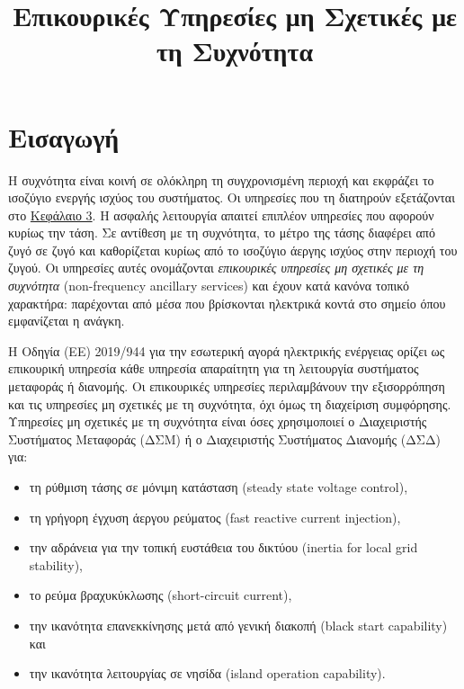 \title{Επικουρικές Υπηρεσίες μη Σχετικές με τη Συχνότητα}

\section{Εισαγωγή}
\label{kef-02-theoria}

Η συχνότητα είναι κοινή σε ολόκληρη τη συγχρονισμένη περιοχή και εκφράζει το ισοζύγιο
ενεργής ισχύος του συστήματος. Οι υπηρεσίες που τη διατηρούν εξετάζονται στο
\hyperref[kef-03-theoria]{Κεφάλαιο 3}. Η ασφαλής λειτουργία απαιτεί επιπλέον υπηρεσίες που
αφορούν κυρίως την τάση. Σε αντίθεση με τη συχνότητα, το μέτρο της τάσης διαφέρει από ζυγό σε
ζυγό και καθορίζεται κυρίως από το ισοζύγιο άεργης ισχύος στην περιοχή του ζυγού. Οι
υπηρεσίες αυτές ονομάζονται \emph{επικουρικές υπηρεσίες μη σχετικές με τη συχνότητα}
(non-frequency ancillary services) και έχουν κατά κανόνα τοπικό χαρακτήρα: παρέχονται από
μέσα που βρίσκονται ηλεκτρικά κοντά στο σημείο όπου εμφανίζεται η ανάγκη.

Η Οδηγία (ΕΕ) 2019/944 για την εσωτερική αγορά ηλεκτρικής ενέργειας ορίζει ως επικουρική
υπηρεσία κάθε υπηρεσία απαραίτητη για τη λειτουργία συστήματος μεταφοράς ή διανομής. Οι
επικουρικές υπηρεσίες περιλαμβάνουν την εξισορρόπηση και τις υπηρεσίες μη σχετικές με τη
συχνότητα, όχι όμως τη διαχείριση συμφόρησης. Υπηρεσίες μη σχετικές με τη συχνότητα είναι
όσες χρησιμοποιεί ο Διαχειριστής Συστήματος Μεταφοράς (ΔΣΜ) ή ο Διαχειριστής Συστήματος
Διανομής (ΔΣΔ) για:

\begin{itemize}
\item τη ρύθμιση τάσης σε μόνιμη κατάσταση (steady state voltage control),
\item τη γρήγορη έγχυση άεργου ρεύματος (fast reactive current injection),
\item την αδράνεια για την τοπική ευστάθεια του δικτύου (inertia for local grid stability),
\item το ρεύμα βραχυκύκλωσης (short-circuit current),
\item την ικανότητα επανεκκίνησης μετά από γενική διακοπή (black start capability) και
\item την ικανότητα λειτουργίας σε νησίδα (island operation capability).
\end{itemize}

